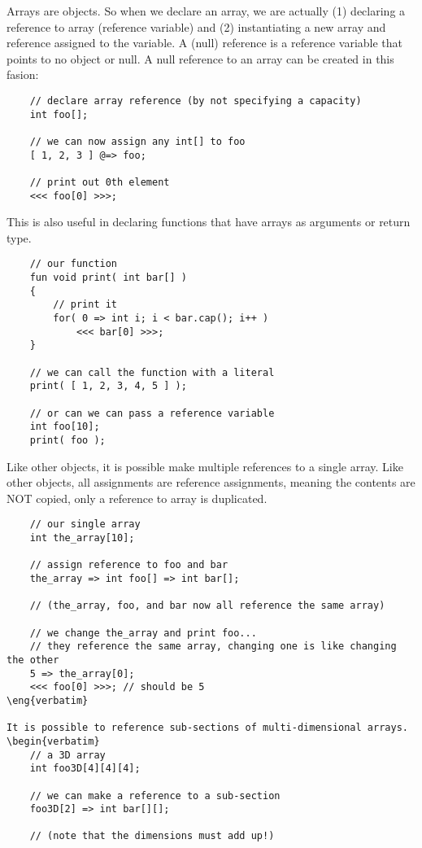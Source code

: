 Arrays are objects. So when we declare an array, we are actually (1) declaring a reference to array (reference variable) and (2) instantiating a new array and reference assigned to the variable. A (null) reference is a reference variable that points to no object or null. A null reference to an array can be created in this fasion:
\begin{verbatim}
    // declare array reference (by not specifying a capacity)
    int foo[];

    // we can now assign any int[] to foo
    [ 1, 2, 3 ] @=> foo;

    // print out 0th element
    <<< foo[0] >>>;
\end{verbatim}

This is also useful in declaring functions that have arrays as arguments or return type.
\begin{verbatim}
    // our function
    fun void print( int bar[] )
    {
        // print it
        for( 0 => int i; i < bar.cap(); i++ )
            <<< bar[0] >>>;
    }

    // we can call the function with a literal
    print( [ 1, 2, 3, 4, 5 ] );

    // or can we can pass a reference variable
    int foo[10];
    print( foo );
\end{verbatim}

Like other objects, it is possible make multiple references to a single array. Like other objects, all assignments are reference assignments, meaning the contents are NOT copied, only a reference to array is duplicated.
\begin{verbatim}
    // our single array
    int the_array[10];

    // assign reference to foo and bar
    the_array => int foo[] => int bar[];

    // (the_array, foo, and bar now all reference the same array)

    // we change the_array and print foo...
    // they reference the same array, changing one is like changing the other
    5 => the_array[0];
    <<< foo[0] >>>; // should be 5
\eng{verbatim}

It is possible to reference sub-sections of multi-dimensional arrays.
\begin{verbatim}
    // a 3D array
    int foo3D[4][4][4];

    // we can make a reference to a sub-section
    foo3D[2] => int bar[][];

    // (note that the dimensions must add up!)
\end{verbatim}